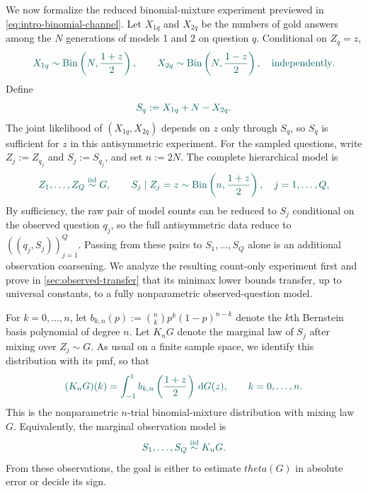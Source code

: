 \documentclass[11pt]{article}
\def\theta{theta}%
\newcommand{\Bin}{\operatorname{Bin}}
\newcommand{\dd}{\,\mathrm d}
\newcommand\aed[1]{{\color{magenta!60!black} #1}}
\newcommand\ced[1]{{\color{teal!70!black} #1}}
\begin{document}
\ced{We now formalize the reduced binomial-mixture experiment previewed in \eqref{eq:intro-binomial-channel}.  Let $X_{1q}$ and $X_{2q}$ be the numbers of gold answers among the $N$ generations of models 1 and 2 on question $q$.  Conditional on $Z_q=z$,}
\[
\ced{X_{1q}\sim\Bin\left(N,\frac{1+z}{2}\right),
\qquad
X_{2q}\sim\Bin\left(N,\frac{1-z}{2}\right),
\quad\text{independently}.}
\]
\ced{Define}
\begin{equation}
\label{eq:S-stat}
\ced{S_q:=X_{1q}+N-X_{2q}.}
\end{equation}
\ced{The joint likelihood of $(X_{1q},X_{2q})$ depends on $z$ only through $S_q$, so $S_q$ is sufficient for $z$ in this antisymmetric experiment.  For the sampled questions, write $Z_j:=Z_{q_j}$ and $S_j:=S_{q_j}$, and set $n:=2N$.  The complete hierarchical model is}
\begin{equation}
\label{eq:scalar-reduced-experiment}
\ced{Z_1,\dots,Z_Q\overset{\mathrm{iid}}{\sim}G,
\qquad
S_j\mid Z_j=z
\sim
\Bin\left(n,\frac{1+z}{2}\right),
\quad j=1,\dots,Q,}
\end{equation}
\ced{By sufficiency, the raw pair of model counts can be reduced to $S_j$ conditional on the observed question $q_j$, so the full antisymmetric data reduce to $((q_j,S_j))_{j=1}^Q$.  Passing from these pairs to $S_1,\dots,S_Q$ alone is an additional observation coarsening.  We analyze the resulting count-only experiment first and prove in \cref{sec:observed-transfer} that its minimax lower bounds transfer, up to universal constants, to a fully nonparametric observed-question model.}

\ced{For $k=0,\dots,n$, let $b_{k,n}(p):=\binom nkp^k(1-p)^{n-k}$ denote the $k$th Bernstein basis polynomial of degree $n$.  Let $K_nG$ denote the marginal law of $S_j$ after mixing over $Z_j\sim G$.  As usual on a finite sample space, we identify this distribution with its pmf, so that}
\begin{equation}
\label{eq:KnG}
\ced{(K_nG)(k)
=
\int_{-1}^1
b_{k,n}\left(\frac{1+z}{2}\right)
\dd G(z),
\qquad k=0,\dots,n.}
\end{equation}
\ced{This is the nonparametric $n$-trial binomial-mixture distribution with mixing law $G$.  Equivalently, the marginal observation model is}
\begin{equation}
\label{eq:scalar-marginal-experiment}
\ced{S_1,\dots,S_Q\overset{\mathrm{iid}}{\sim}K_nG.}
\end{equation}
From these observations, the goal is either to estimate $\theta(G)$ in absolute error or \aed{decide its sign}. %
\end{document}

